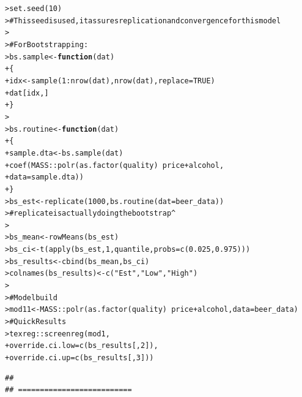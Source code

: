 \documentclass[12pt]{article}\usepackage[]{graphicx}\usepackage[]{color}
\makeatletter
\newcommand{\hlnum}[1]{\textcolor[rgb]{0.82,0.78,0.62}{#1}}%
\newcommand{\hlstr}[1]{\textcolor[rgb]{0.82,0.78,0.62}{#1}}%
\newcommand{\hlcom}[1]{\textcolor[rgb]{0.404,0.408,0.42}{#1}}%
\newcommand{\hlopt}[1]{\textcolor[rgb]{0.882,0.878,0.898}{#1}}%
\newcommand{\hlstd}[1]{\textcolor[rgb]{0.882,0.878,0.898}{#1}}%
\newcommand{\hlkwa}[1]{\textcolor[rgb]{0.384,0.675,0.808}{\textbf{#1}}}%
\newcommand{\hlkwb}[1]{\textcolor[rgb]{0.902,0.675,0.196}{#1}}%
\newcommand{\hlkwc}[1]{\textcolor[rgb]{0.812,0.522,0.388}{#1}}%
\newcommand{\hlkwd}[1]{\textcolor[rgb]{0.733,0.388,0.812}{#1}}%
\newenvironment{kframe}{%
 \def\at@end@of@kframe{}%
 \ifinner\ifhmode%
  \def\at@end@of@kframe{\end{minipage}}%
  \begin{minipage}{\columnwidth}%
 \fi\fi%
 \def\FrameCommand##1{\hskip\@totalleftmargin \hskip-\fboxsep
 \colorbox{shadecolor}{##1}\hskip-\fboxsep
     \hskip-\linewidth \hskip-\@totalleftmargin \hskip\columnwidth}%
 \MakeFramed {\advance\hsize-\width
   \@totalleftmargin\z@ \linewidth\hsize
   \@setminipage}}%
 {\par\unskip\endMakeFramed%
 \at@end@of@kframe}
\newenvironment{knitrout}{}{} %
\makeatother
\begin{document}
\begin{flushleft}
\begin{knitrout}
\color{fgcolor}\begin{kframe}
\begin{alltt}
\hlstd{> }\hlkwd{set.seed}\hlstd{(}\hlnum{10}\hlstd{)}
\hlstd{> }\hlcom{# This seed is used, it assures replication and convergence for this model}
\hlstd{> }
\hlstd{> }\hlcom{# For Bootstrapping:}
\hlstd{> }\hlstd{bs.sample} \hlkwb{<-} \hlkwa{function}\hlstd{(}\hlkwc{dat}\hlstd{)}
\hlstd{+ }\hlstd{\{}
\hlstd{+ }  \hlstd{idx} \hlkwb{<-} \hlkwd{sample}\hlstd{(}\hlnum{1}\hlopt{:}\hlkwd{nrow}\hlstd{(dat),} \hlkwd{nrow}\hlstd{(dat),} \hlkwc{replace} \hlstd{=} \hlnum{TRUE}\hlstd{)}
\hlstd{+ }  \hlstd{dat[idx,]}
\hlstd{+ }\hlstd{\}}
\hlstd{> }
\hlstd{> }\hlstd{bs.routine} \hlkwb{<-} \hlkwa{function}\hlstd{(}\hlkwc{dat}\hlstd{)}
\hlstd{+ }\hlstd{\{}
\hlstd{+ }  \hlstd{sample.dta} \hlkwb{<-} \hlkwd{bs.sample}\hlstd{(dat)}
\hlstd{+ }  \hlkwd{coef}\hlstd{(MASS}\hlopt{::}\hlkwd{polr}\hlstd{(}\hlkwd{as.factor}\hlstd{(quality)} \hlopt{~} \hlstd{price} \hlopt{+} \hlstd{alcohol,}
\hlstd{+ }                  \hlkwc{data} \hlstd{= sample.dta))}
\hlstd{+ }\hlstd{\}}
\hlstd{> }\hlstd{bs_est} \hlkwb{<-} \hlkwd{replicate}\hlstd{(}\hlnum{1000}\hlstd{,} \hlkwd{bs.routine}\hlstd{(}\hlkwc{dat} \hlstd{= beer_data))}
\hlstd{> }\hlcom{# replicate is actually doing the bootstrap^}
\hlstd{> }
\hlstd{> }\hlstd{bs_mean} \hlkwb{<-} \hlkwd{rowMeans}\hlstd{(bs_est)}
\hlstd{> }\hlstd{bs_ci} \hlkwb{<-} \hlkwd{t}\hlstd{(}\hlkwd{apply}\hlstd{(bs_est,} \hlnum{1}\hlstd{, quantile,} \hlkwc{probs} \hlstd{=} \hlkwd{c}\hlstd{(}\hlnum{0.025}\hlstd{,} \hlnum{0.975}\hlstd{)))}
\hlstd{> }\hlstd{bs_results} \hlkwb{<-} \hlkwd{cbind}\hlstd{(bs_mean, bs_ci)}
\hlstd{> }\hlkwd{colnames}\hlstd{(bs_results)} \hlkwb{<-} \hlkwd{c}\hlstd{(}\hlstr{"Est"}\hlstd{,} \hlstr{"Low"}\hlstd{,} \hlstr{"High"}\hlstd{)}
\hlstd{> }
\hlstd{> }\hlcom{# Model build}
\hlstd{> }\hlstd{mod11} \hlkwb{<-} \hlstd{MASS}\hlopt{::}\hlkwd{polr}\hlstd{(}\hlkwd{as.factor}\hlstd{(quality)} \hlopt{~} \hlstd{price} \hlopt{+} \hlstd{alcohol,} \hlkwc{data}\hlstd{=beer_data)}
\hlstd{> }\hlcom{# Quick Results}
\hlstd{> }\hlstd{texreg}\hlopt{::}\hlkwd{screenreg}\hlstd{(mod1,}
\hlstd{+ }                  \hlkwc{override.ci.low} \hlstd{=} \hlkwd{c}\hlstd{(bs_results[,} \hlnum{2}\hlstd{]),}
\hlstd{+ }                  \hlkwc{override.ci.up} \hlstd{=} \hlkwd{c}\hlstd{(bs_results[,} \hlnum{3}\hlstd{]))}
\end{alltt}
\begin{verbatim}
## 
## ==========================

\end{verbatim}
\end{kframe}
\end{knitrout}
\end{flushleft}
\end{document}
